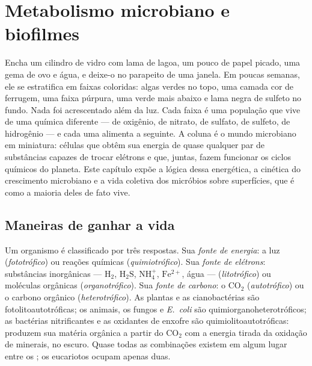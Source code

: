 \chapter{Metabolismo microbiano e biofilmes}\label{ch:b2:microbial-metabolism}

Encha um cilindro de vidro com lama de lagoa, um pouco de papel
picado, uma gema de ovo e água, e deixe-o no parapeito de uma janela.
Em poucas semanas, ele se estratifica em faixas coloridas: algas verdes
no topo, uma camada cor de ferrugem, uma faixa púrpura, uma verde mais
abaixo e lama negra de sulfeto no fundo. Nada foi acrescentado além da
luz. Cada faixa é uma população que vive de uma química diferente ---
de oxigênio, de nitrato, de sulfato, de sulfeto, de hidrogênio --- e
cada uma alimenta a seguinte. A coluna é o mundo microbiano em
miniatura: células que obtêm sua energia de quase qualquer par de
substâncias capazes de trocar elétrons e que, juntas, fazem funcionar
os ciclos químicos do planeta. Este capítulo expõe a lógica dessa
energética, a cinética do crescimento microbiano e a vida coletiva dos
micróbios sobre superfícies, que é como a maioria deles de fato vive.

\section{Maneiras de ganhar a vida}

\begin{definition}\label{def:b2:microbial-metabolism:trophic}
Um organismo é classificado por três respostas. Sua \emph{fonte de
energia}: a luz (\emph{fototrófico}) ou reações químicas
(\emph{quimiotrófico}). Sua \emph{fonte de elétrons}: substâncias
inorgânicas --- $\mathrm{H_2}$,
$\mathrm{H_2S}$, $\mathrm{NH_4^+}$, $\mathrm{Fe^{2+}}$, água ---
(\emph{litotrófico}) ou moléculas orgânicas (\emph{organotrófico}). Sua
\emph{fonte de carbono}: o $\mathrm{CO_2}$ (\emph{autotrófico}) ou o
carbono orgânico (\emph{heterotrófico}). As plantas e as cianobactérias
são fotolitoautotróficas; os animais, os fungos e \emph{E.~coli} são
quimiorganoheterotróficos; as bactérias nitrificantes e as oxidantes
de enxofre são quimiolitoautotróficas: produzem sua matéria orgânica a
partir do $\mathrm{CO_2}$ com a energia tirada da oxidação de
minerais, no escuro. Quase todas as combinações existem em algum lugar
entre os ; os eucariotos ocupam apenas duas.
\end{definition}


